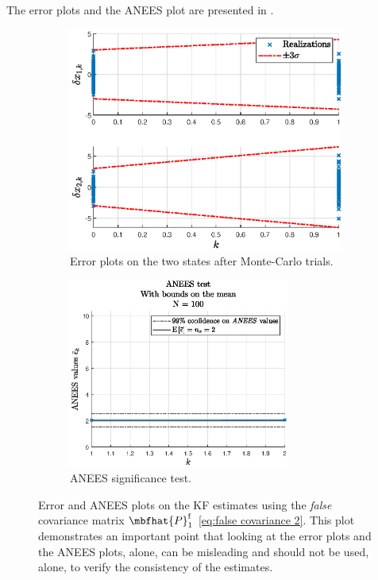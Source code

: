 \documentclass{simple-article}
\begin{document}
The error plots and the ANEES plot are presented in .

\begin{figure}[H]
  \centering
  \begin{subfigure}{0.45\textwidth}
    \includegraphics[width=\textwidth]{figs/Phat_lmi/error_plots_N100_falseCovariance_scatter.eps}
    \caption{Error plots on the two states after Monte-Carlo trials.}
    \label{fig:error_plots_N100_falseCovariance_scatter 2}
  \end{subfigure}
  \begin{subfigure}{0.45\textwidth}
    \includegraphics[width=0.8\textwidth]{figs/Phat_lmi/anees_N100_falseCovariance.eps}    
    \caption{ANEES significance test.}
    \label{fig:anees_N100_falseCovariance 2}
  \end{subfigure}
  \caption{Error and ANEES plots on the KF estimates using the \emph{false} covariance matrix $\mbfhat{P}_{1}^{\mathrm{f}}$ \eqref{eq:false covariance 2}. This plot demonstrates an important point that looking at the error plots and the ANEES plots, alone, can be misleading and should not be used, alone, to verify the consistency of the estimates.}
  \label{fig:false covariance plots 2}
\end{figure}
\printbibliography
\end{document}
